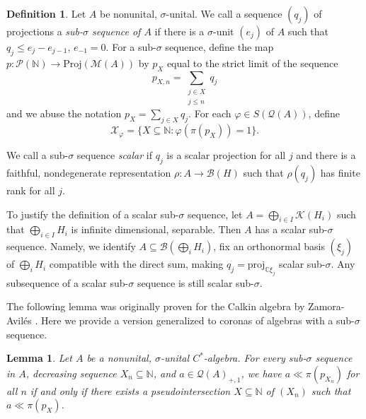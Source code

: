 \documentclass[10pt]{amsart}
\newtheorem{lem}[thm]{Lemma}
\theoremstyle{definition}
\newtheorem{defn}[thm]{Definition}
\newcommand{\Proj}{\mathrm{Proj}}
\newcommand{\Xp}{\mathscr{X}_\varphi}
\begin{document}
\begin{defn}\label{Pbuilder}
    Let $A$ be nonunital, $\sigma$-unital. We call a sequence $(q_j)$ of projections a \textit{sub-$\sigma$ sequence of $A$} if there is a $\sigma$-unit $(e_j)$ of $A$ such that $q_j\leq e_j-e_{j-1}$, $e_{-1}=0$. For a sub-$\sigma$ sequence, define the map $p:\mathscr{P}(\mathbb{N})\rightarrow\Proj(\mathscr{M}(A))$ by $p_X$ equal to the strict limit of the sequence
    \[p_{X,n}=\sum_{\substack{j\in X \\ j\leq n}}q_j\]
    and we abuse the notation $p_X=\sum_{j\in X}q_j$.
    For each $\varphi\in S(\mathscr{Q}(A))$, define
    \[\Xp=\{X\subseteq\mathbb{N}:\varphi(\pi(p_X))=1\}.\]

    We call a sub-$\sigma$ sequence \textit{scalar} if $q_j$ is a scalar projection for all $j$ and there is a faithful, nondegenerate representation $\rho:A\rightarrow \mathscr{B}(H)$ such that $\rho(q_j)$ has finite rank for all $j$.
\end{defn}

To justify the definition of a scalar sub-$\sigma$ sequence, let $A=\bigoplus_{i\in I}\mathscr{K}(H_i)$ such that $\bigoplus_{i\in I}H_i$ is infinite dimensional, separable. Then $A$ has a scalar sub-$\sigma$ sequence. Namely, we identify $A\subseteq\mathscr{B}(\bigoplus_i H_i)$, fix an orthonormal basis $(\xi_j)$ of $\bigoplus_iH_i$ compatible with the direct sum, making $q_j=\text{proj}_{\mathbb{C}\xi_j}$ scalar sub-$\sigma$. Any subsequence of a scalar sub-$\sigma$ sequence is still scalar sub-$\sigma$.

The following lemma was originally proven for the Calkin algebra by Zamora-Avilés \cite[2.5.10]{ZA10}. Here we provide a version generalized to coronas of algebras with a sub-$\sigma$ sequence.

\begin{lem}\label{beatr}
    Let $A$ be a nonunital, $\sigma$-unital $C^*$-algebra. For every sub-$\sigma$ sequence in $A$, decreasing sequence $X_n\subseteq\mathbb{N}$, and $a\in \mathscr{Q}(A)_{+,1}$, we have $a\ll \pi(p_{X_n})$ for all $n$ if and only if there exists a pseudointersection $X\subseteq\mathbb{N}$ of $(X_n)$ such that $a\ll \pi(p_X)$.
\end{lem}
\end{document}
